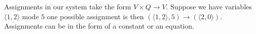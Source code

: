 Assignments in our system take the form $V \times Q \rightarrow V$. Suppose we have variables $\langle 1,2 \rangle$ mode $5$ one possible assignment is then $( \langle 1,2 \rangle,5) \rightarrow ( \langle 2,0 \rangle )$. Assignments can be in the form of a constant or an equation.


%
%
%

